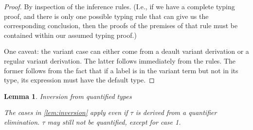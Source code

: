 \documentclass{article}
\newtheorem{lemma}{Lemma}
\begin{document}
\begin{proof}
By inspection of the inference rules. (I.e., if we have a complete typing proof,
and there is only one possible typing rule that can give us the corresponding conclusion,
then the proofs of the premises of that rule must be contained within our assumed typing proof.)

One caveat: the variant case can either come from a deault variant derivation or
a regular variant derivation. The latter follows immediately from the rules. The
former follows from the fact that if a label is in the variant term but not in
its type, its expression must have the default type.


\end{proof}

\begin{lemma}{Inversion from quantified types} \label{lem:inversion-from-quantified}

  The cases in \ref{lem:inversion} apply even if \(\tau\) is derived from a
  quantifier elimination. \(\tau\) may still not be quantified, except for case 1.

\end{lemma}
\end{document}

